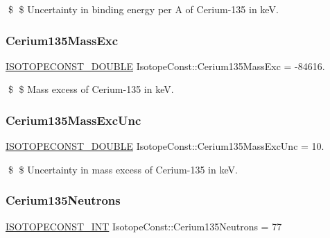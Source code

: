 \$ \$ Uncertainty in binding energy per A of Cerium-\/135 in keV. \mbox{\label{group___isotope_const-_cerium-_ce135_ga4a0efef94dd665f8b21ac87247c189f5}} 
\subsubsection{\texorpdfstring{Cerium135\+Mass\+Exc}{Cerium135MassExc}}
{\footnotesize\ttfamily \mbox{\hyperlink{group___isotope_const-_macros_ga8f45a7272ce02c0b4c65c44636ed719a}{I\+S\+O\+T\+O\+P\+E\+C\+O\+N\+S\+T\+\_\+\+D\+O\+U\+B\+LE}} Isotope\+Const\+::\+Cerium135\+Mass\+Exc = -\/84616.}

\$ \$ Mass excess of Cerium-\/135 in keV. \mbox{\label{group___isotope_const-_cerium-_ce135_ga691cc80c26b220ffbfdde04d58199d3d}} 
\subsubsection{\texorpdfstring{Cerium135\+Mass\+Exc\+Unc}{Cerium135MassExcUnc}}
{\footnotesize\ttfamily \mbox{\hyperlink{group___isotope_const-_macros_ga8f45a7272ce02c0b4c65c44636ed719a}{I\+S\+O\+T\+O\+P\+E\+C\+O\+N\+S\+T\+\_\+\+D\+O\+U\+B\+LE}} Isotope\+Const\+::\+Cerium135\+Mass\+Exc\+Unc = 10.}

\$ \$ Uncertainty in mass excess of Cerium-\/135 in keV. \mbox{\label{group___isotope_const-_cerium-_ce135_ga2c8fb14a4edd887070a9743c7f7f0d27}} 
\subsubsection{\texorpdfstring{Cerium135\+Neutrons}{Cerium135Neutrons}}
{\footnotesize\ttfamily \mbox{\hyperlink{group___isotope_const-_macros_ga5f18360b3e99483a35c32d789e62621c}{I\+S\+O\+T\+O\+P\+E\+C\+O\+N\+S\+T\+\_\+\+I\+NT}} Isotope\+Const\+::\+Cerium135\+Neutrons = 77}

